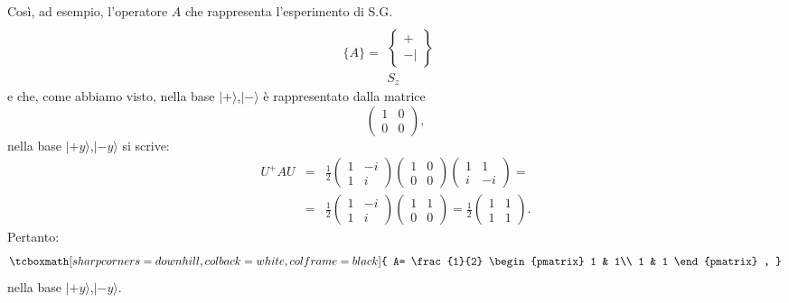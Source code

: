 \documentclass[a4paper,12pt,oneside]{book}
\begin{document}
Così, ad esempio, l'operatore $A$ che rappresenta l'esperimento di S.G.
	\begin{equation}
		\bigg\lbrace A\bigg\rbrace =
		\begin{matrix}
		\
		\\[0.25cm]
		\begin{Bmatrix}
		 +  \\ - |  
		\end{Bmatrix} \\[0.5cm]
		S_z&
		\end{matrix}
	\end{equation}
e che, come abbiamo visto, nella base $| + \rangle $,$| - \rangle $ è rappresentato dalla matrice
	\begin{equation}
		\begin{pmatrix}
		1 & 0\\
		0 & 0
		\end{pmatrix} ,
	\end{equation}
nella base $| +y \rangle $,$| -y \rangle$ si scrive:
	\begin{eqnarray}
		U^+AU &=& \frac{1}{2}
		\begin{pmatrix}
		1 & -i\\
		1 & i
		\end{pmatrix}
		\begin{pmatrix}
		1 & 0\\
		0 & 0
		\end{pmatrix}
		\begin{pmatrix}
		1 & 1\\
		i & -i
		\end{pmatrix}= \nonumber \\
		&=&\frac{1}{2}
		\begin{pmatrix}
		1 & -i\\
		1 & i
		\end{pmatrix}
		\begin{pmatrix}
		1 & 1\\
		0 & 0
		\end{pmatrix}=
		\frac{1}{2}
		\begin{pmatrix}
		1 & 1\\
		1 & 1
		\end{pmatrix} .
		\end{eqnarray}
Pertanto:
	\begin{equation}
		\tcboxmath[sharp corners=downhill, colback=white, colframe=black]{
			A= \frac{1}{2}
			\begin{pmatrix}
			1 & 1\\
			1 & 1
			\end{pmatrix} ,
			}
	\end{equation}
nella base $| +y \rangle $,$| -y \rangle $.\\
\end{document}
